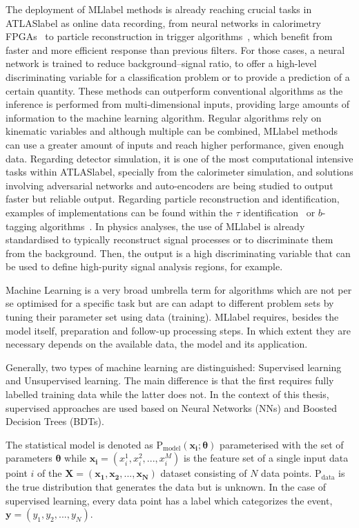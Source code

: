 The deployment of \acrshort{MLlabel} methods is already reaching crucial tasks in \acrshort{ATLASlabel} as online data recording, from neural networks in calorimetry FPGAs~\cite{Laatu:2022fni} to particle reconstruction in trigger algorithms~\cite{ATLAS:2019uhp}, which benefit from faster and more efficient response than previous filters. For those cases, a neural network is trained to reduce background--signal ratio, to offer a high-level discriminating variable for a classification problem or to provide a prediction of a certain quantity. These methods can outperform conventional algorithms as the inference is performed from multi-dimensional inputs, providing large amounts of information to the machine learning algorithm. Regular algorithms rely on kinematic variables and although multiple can be combined, \acrshort{MLlabel} methods can use a greater amount of inputs and reach higher performance, given enough data. Regarding detector simulation, it is one of the most computational intensive tasks within \acrshort{ATLASlabel}, specially from the calorimeter simulation, and solutions involving adversarial networks and auto-encoders are being studied to output faster but reliable output. Regarding particle reconstruction and identification, examples of implementations can be found within the $\tau$ identification~\cite{ATLAS:2019uhp} or $b$-tagging algorithms~\cite{ATL-PHYS-PUB-2020-014}. In physics analyses, the use of \acrshort{MLlabel} is already standardised to typically reconstruct signal processes or to discriminate them from the background. Then, the output is a high discriminating variable that can be used to define high-purity signal analysis regions, for example.

Machine Learning is a very broad umbrella term for algorithms which are not per se optimised for a specific task but are can adapt to different problem sets by tuning their parameter set using data (training).
\acrshort{MLlabel} requires, besides the model itself, preparation and follow-up processing steps. In which extent they are necessary depends on the available data, the model and its application.

Generally, two types of machine learning are distinguished: Supervised learning and Unsupervised learning. The main difference is that the first requires fully labelled training data while the latter does not. In the context of this thesis, supervised approaches are used based on Neural Networks (NNs) and Boosted Decision Trees (BDTs).

The statistical model is denoted as $\text{P}_\text{model}(\mathbf{x_i}; \boldsymbol{\theta})$ parameterised with the set of parameters $\boldsymbol{\theta}$ while $\mathbf{x_i}=(x_i^1,x_i^2,...,x_i^M)$ is the feature set of a single input data point $i$ of the $\mathbf{X}=(\mathbf{x_1},\mathbf{x_2},...,\mathbf{x_N})$ dataset consisting of $N$ data points. $\text{P}_\text{data}$ is the true distribution that generates the data but is unknown. In the case of supervised learning, every data point has a label which categorizes the event, $\mathbf{y}=(y_1,y_2,...,y_N)$.

